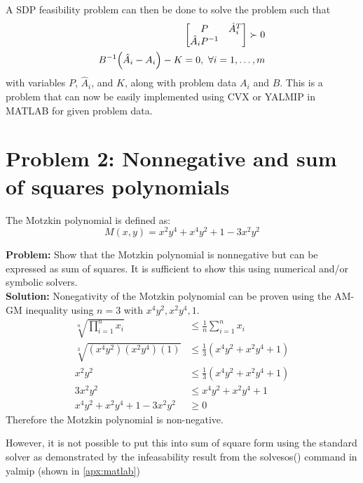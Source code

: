 \documentclass[letter]{article}
\begin{document}
A SDP feasibility problem can then  be done to solve the problem such that
\begin{equation}
	\begin{aligned}
		\mqty[P & \hat{A}_i^T\\ \hat{A}_i P^{-1}] \succ 0\\
		B^{-1} \qty(\hat{A}_i - A_i) - K = 0, \ \forall i = 1, \dots, m
	\end{aligned}
\end{equation}
with variables $P$, $\hat{A}_i$, and $K$, along with problem data $A_i$ and $B$.
This is a problem that can now be easily implemented using CVX or YALMIP in MATLAB for given problem data.


\newpage
\section{Problem 2: Nonnegative and sum of squares polynomials}
The Motzkin polynomial is defined as:
\begin{equation}
	M(x,y) = x^2 y^4 + x^4 y^2 + 1 - 3 x^2 y^2
\end{equation}

\textbf{Problem:}
Show that the Motzkin polynomial is nonnegative but can be expressed as sum of squares. It is sufficient to show this using numerical and/or symbolic solvers.\\

\textbf{Solution:}
Nonegativity of the Motzkin polynomial can be proven using the AM-GM inequality using $n=3$ with $x^4y^2, x^2 y^4, 1$.
\begin{align}
	\sqrt[n]{\prod_{i=1}^{n} x_i} &\leq \frac{1}{n} \sum_{i=1}^n x_i\\
	\sqrt[3]{(x^4 y^2)(x^2 y^4)(1)} &\leq \frac{1}{3} (x^4 y^2 + x^2 y^4 + 1)\\
	x^2 y^2 &\leq \frac{1}{3} (x^4 y^2 + x^2 y^4 + 1)\\
	3 x^2 y^2 &\leq x^4 y^2 + x^2 y^4 + 1\\
	x^4 y^2 + x^2 y^4 + 1 - 3 x^2 y^2 &\geq 0
\end{align}
Therefore the Motzkin polynomial is non-negative.

However, it is not possible to put this into sum of square form using the standard solver as demonstrated by the infeasability result from the solvesos() command in yalmip (shown in \appendixname \ref{apx:matlab})
\end{document}
